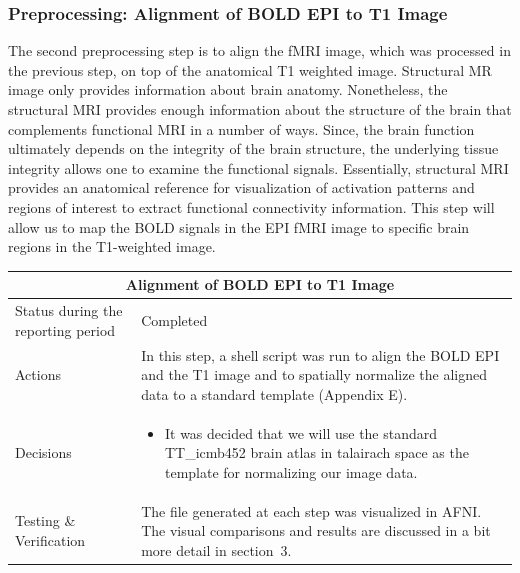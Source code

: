 \documentclass[12pt]{article}
\begin{document}
\subsubsection{Preprocessing: Alignment of BOLD EPI to T1 Image}%
\label{sub:}

The second preprocessing step is to align the fMRI image, which was
processed in the previous step, on top of the anatomical T1 weighted
image. Structural MR image only provides information about brain
anatomy. Nonetheless, the structural MRI provides enough information
about the structure of the brain that complements functional MRI in a
number of ways. Since, the brain function ultimately depends on the
integrity of the brain structure, the underlying tissue integrity
allows one to examine the functional signals. Essentially, structural
MRI provides an anatomical reference for visualization of activation
patterns and regions of interest to extract functional connectivity
information. This step will allow us to map the BOLD signals in the
EPI fMRI image to specific brain regions in the T1-weighted image.

\begin{table}[H]
  \centering
  \begin{tabular} {| m{3.3cm} | m{11.5cm} | }
    \hline
    \multicolumn{2}{|c|}{Alignment of BOLD EPI to T1 Image } \\ \hline
    Status during the reporting period & Completed    \\ \hline
    Actions &
    In this step, a shell script was run to align the BOLD EPI and the
    T1 image and to spatially normalize the aligned data to a standard
    template (Appendix E). \\ \hline

    Decisions &
    \begin{itemize}

      \item It was decided that we will use the standard TT\_icmb452
        brain
        atlas in talairach space as the template for normalizing our
        image data.

    \end{itemize} \\ \hline

    Testing \& Verification &
    The file generated at each step was visualized in AFNI. The
    visual comparisons and results are discussed in a bit more detail
    in section~3. \\ \hline

  \end{tabular}
\end{table}
\end{document}
